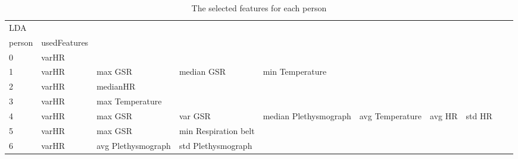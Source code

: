 \begin{landscape}
\begin{table}[]
\centering
\caption{The selected features for each person}
\begin{tabular}{l|llllllll}
LDA      &                         &                       &                         &                         &                         &                       &                      &          &                      &        \\
person   & usedFeatures            &                       &                         &                         &                         &                       &                      &          &                      &        \\
0        & varHR                   &                       &                         &                         &                         &                       &                      &          &                      &        \\
1        & varHR                   & max GSR               & median GSR              & min Temperature         &                         &                       &                      &          &                      &        \\
2        & varHR                   & medianHR              &                         &                         &                         &                       &                      &          &                      &        \\
3        & varHR                   & max Temperature       &                         &                         &                         &                       &                      &          &                      &        \\
4        & varHR                   & max GSR               & var GSR                 & median Plethysmograph   & avg Temperature         & avg HR                & std HR               &          &                      &        \\
5        & varHR                   & max GSR               & min Respiration belt    &                         &                         &                       &                      &          &                      &        \\
6        & varHR                   & avg Plethysmograph    & std Plethysmograph      &                         &                         &                       &                      &          &                      &        \\

\end{tabular}
\end{table}
\end{landscape}
